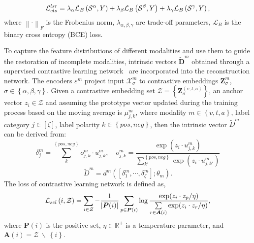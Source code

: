\begin{equation}
\small
    \mathcal{L}_{cls}^{lsr}=\lambda_\alpha\mathcal{L}_{B}\left ( \mathcal{S}^\alpha,Y \right )+\lambda_\beta\mathcal{L}_{B}\left ( \mathcal{S}^\beta,Y \right )+\lambda_\gamma\mathcal{L}_{B}\left ( \mathcal{S}^\gamma,Y \right ),
\end{equation}
where $\left\| \cdot \right\|_{F}$ is the Frobenius norm, $\lambda_{\alpha,\beta,\gamma}$ are trade-off parameters, $\mathcal{L}_{B}$ is the binary cross entropy (BCE) loss. 

To capture the feature distributions of different modalities and use them to guide the restoration of incomplete modalities, intrinsic vectors $\bm{\widetilde{D}}^{m}$ obtained through a supervised contrastive learning network~\cite{SCL} are incorporated into the reconstruction network. 
The encoders $\varepsilon^m$ project input $\bm{\mathcal X}_{\sigma}^{m}$ to contrastive embeddings $\bm{Z}_{\sigma}^{m}$, $\sigma \in \left\{\alpha,\beta,\gamma \right\}$. Given a contrastive embedding set $\bm{\mathcal{Z}}=\left\{ \bm{Z}_{\sigma}^{\left\{ v, t, a\right\}} \right\}$, an anchor vector $z_i \in \mathcal{Z}$ and assuming the prototype vector updated during the training process based on the moving average is $\mu_{j,k}^{m}$, where modality $m \in \left\{v,t,a \right\}$, label category $j \in \left [ \zeta \right ]$, label polarity $k \in \left\{pos,neg \right\}$, then the intrinsic vector $\widetilde{D}^{m}$ can be derived from:
\begin{equation}
\delta_j^m = \sum_{k}^{\left\{ pos, neg\right\}} o_{j,k}^m \cdot u_{j,k}^m, \quad  o_{j,k}^m = \frac{\exp(z_i \cdot u_{j,k}^m)}{\sum_{k'}^{\left\{ pos, neg\right\}} \exp(z_i \cdot u_{j,k'}^m)}
\end{equation}
\begin{equation}
    \widetilde{D}^{m}=d^m\left ( \left [ \delta_{1}^{m}, \cdots, \delta_{\zeta}^{m}  \right ]; \theta_m \right ).
\end{equation}
The loss of contrastive learning network is defined as, 
\begin{equation}
\small
\label{L_scl}
\mathcal{L}_{scl}\left ( i, \mathcal{Z} \right ) = \sum_{i \in \mathcal{Z}} -\frac{1}{|\bm{P}(i)|} \sum_{p \in \bm{P}(i)} \log \frac{\exp(z_i \cdot z_p / \eta)}{\sum\limits_{r \in \bm{A}(i)} \exp(z_i \cdot z_r / \eta)},
\end{equation}
where $\bm{P}(i)$ is the positive set, $\eta \in \mathbb{R}^+$ is a temperature parameter, and $\bm{A}(i)= \bm{\mathcal{Z}}\ \backslash\ {\left\{i \right\}}$. 



